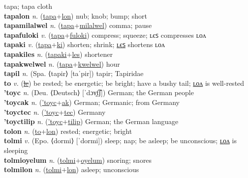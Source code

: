 tapa; tapa cloth \label{'tapa} \\
\textbf{tapalon} \textit{n.} (\hyperref[tapa]{tapa}+\hyperref[lon]{lon})
nub; knob; bump; short \label{tapalon} \\
\textbf{tapamilalwel} \textit{n.} (\hyperref[tapa]{tapa}+\hyperref[milalwel]{milalwel})
comma; pause \label{tapamilalwel} \\
\textbf{tapafuloki} \textit{v.} (\hyperref[tapa]{tapa}+\hyperref[fuloki]{fuloki})
compress; squeeze; ʟєꜱ compresses ʟᴏᴧ \label{tapafuloki} \\
\textbf{tapaki} \textit{v.} (\hyperref[tapa]{tapa}+\hyperref[ki]{ki})
shorten; shrink; \hyperref[tapakiles]{ʟєꜱ} shortens ʟᴏᴧ \label{tapaki} \\
\textbf{tapakiles} \textit{n.} (\hyperref[tapaki]{tapaki}+\hyperref[les]{les})
shortener \label{tapakiles} \\
\textbf{tapakwelwel} \textit{n.} (\hyperref[tapa]{tapa}+\hyperref[kwelwel]{kwelwel})
hour \label{tapakwelwel} \\
\textbf{tapil} \textit{n.} (Spa. ⟨tapir⟩ [taˈpir])
tapir; Tapiridae \label{tapil} \\
\textbf{to} \textit{v.} (\hyperref[le]{\sout{le}})
be rested; be energetic; be bright; have a bushy tail; \hyperref[tolon]{ʟᴏᴧ} is well-rested \label{to} \\
\textbf{'toyc} \textit{n.} (Deu. ⟨Deutsch⟩ [ˈdɔʏ̯t͡ʃ])
German; the German people \label{'toyc} \\
\textbf{'toycak} \textit{n.} (\hyperref['toyc]{'toyc}+\hyperref[ak]{ak})
German; Germanic; from Germany \label{'toycak} \\
\textbf{'toyctec} \textit{n.} (\hyperref['toyc]{'toyc}+\hyperref[tec]{tec})
Germany \label{'toyctec} \\
\textbf{'toyctilip} \textit{n.} (\hyperref['toyc]{'toyc}+\hyperref[tilip]{tilip})
German; the German language \label{'toyctilip} \\
\textbf{tolon} \textit{n.} (\hyperref[to]{to}+\hyperref[lon]{lon})
rested; energetic; bright \label{tolon} \\
\textbf{tolmi} \textit{v.} (Epo. ⟨dormi⟩ [ˈdormi])
sleep; nap; be asleep; be unconscious; \hyperref[tolmilon]{ʟᴏᴧ} is sleeping \label{tolmi} \\
\textbf{tolmioyelum} \textit{n.} (\hyperref[tolmi]{tolmi}+\hyperref[oyelum]{oyelum})
snoring; snores \label{tolmioyelum} \\
\textbf{tolmilon} \textit{n.} (\hyperref[tolmi]{tolmi}+\hyperref[lon]{lon})
asleep; unconscious \label{tolmilon} \\
